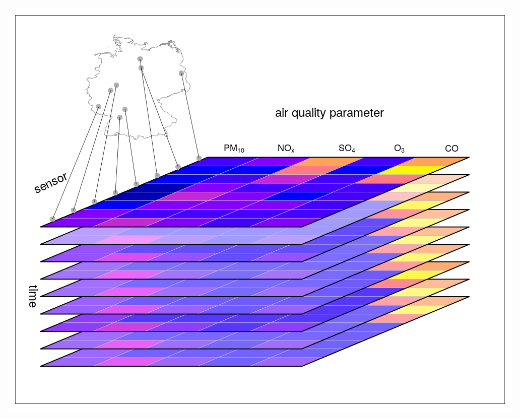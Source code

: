 \documentclass{beamer}
\begin{document}
\begin{frame}{}
\begin{columns}[t]
\begin{column}{.18\linewidth}
      \includegraphics[width=\columnwidth]{cube4.png}
      \end{column}
      
    \end{columns}
  \end{frame}
\end{document}
